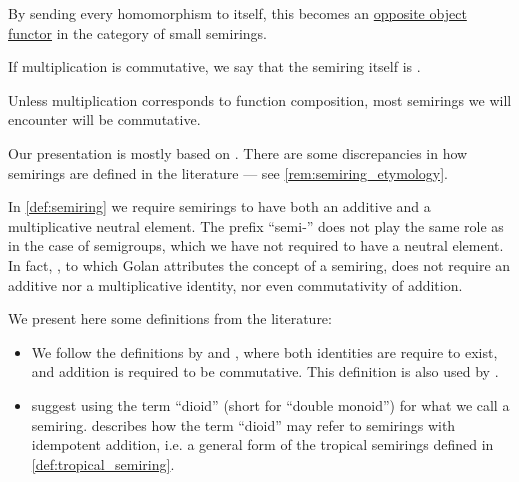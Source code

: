 \begin{definition}
\begin{thmenum}
    By sending every homomorphism to itself, this becomes an \hyperref[con:opposite_object]{opposite object functor} in the category of small semirings.

     If multiplication is commutative, we say that the semiring itself is .

    Unless multiplication corresponds to function composition, most semirings we will encounter will be commutative.
  \end{thmenum}
\end{definition}
\begin{comments}
  \item Our presentation is mostly based on \cite[1]{Golan1999Semirings}. There are some discrepancies in how semirings are defined in the literature --- see \cref{rem:semiring_etymology}.
\end{comments}

\begin{remark}\label{rem:semiring_etymology}
  In \cref{def:semiring} we require semirings to have both an additive and a multiplicative neutral element. The prefix \enquote{semi-} does not play the same role as in the case of semigroups, which we have not required to have a neutral element. In fact, \textcite{Vandiver1934Semirings}, to which Golan attributes the concept of a semiring, does not require an additive nor a multiplicative identity, nor even commutativity of addition.

  We present here some definitions from the literature:
  \begin{itemize}
    \item We follow the definitions by \textcite[1]{Golan1999Semirings} and \textcite[2]{Pin1998TropicalSemirings}, where both identities are require to exist, and addition is required to be commutative. This definition is also used by \textcite[def. 3.1]{БелоусовТкачёв2004ДискретнаяМатематика}.

    \item \Textcite*[ch. 3]{GondranMinoux1984GraphsAndAlgorithms} suggest using the term \enquote{dioid} (short for \enquote{double monoid}) for what we call a semiring. \Textcite[xi]{Golan1999Semirings} describes how the term \enquote{dioid} may refer to semirings with idempotent addition, i.e. a general form of the tropical semirings defined in \cref{def:tropical_semiring}.
  \end{itemize}
\end{remark}

